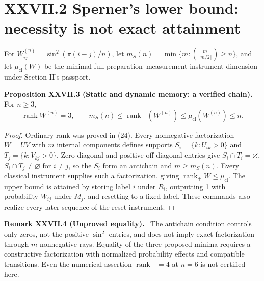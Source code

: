 \documentclass[11pt,a4paper,oneside]{book}
\DeclareMathOperator{\rank}{rank}\DeclareMathOperator{\Tr}{Tr}
\newcommand{\statement}[3]{\par\medskip\noindent\textbf{#1 #2 (#3).}\ }
\begin{document}
\section*{XXVII.2 Sperner's lower bound: necessity is not exact attainment}
For $W^{(n)}_{ij}=\sin^2(\pi(i-j)/n)$, let $m_S(n)=\min\{m:\binom m{\lfloor m/2\rfloor}\ge n\}$, and let $\mu_{\mathrm{cl}}(W)$ be the minimal full preparation--measurement instrument dimension under Section II's passport.
\statement{Proposition}{XXVII.3}{Static and dynamic memory: a verified chain} For $n\ge3$,
\begin{equation}\rank W^{(n)}=3,\qquad m_S(n)\le\rank_+(W^{(n)})\le\mu_{\mathrm{cl}}(W^{(n)})\le n.\tag{108}\end{equation}
\begin{proof}Ordinary rank was proved in (24). Every nonnegative factorization $W=UV$ with $m$ internal components defines supports $S_i=\{k:U_{ik}>0\}$ and $T_j=\{k:V_{kj}>0\}$. Zero diagonal and positive off-diagonal entries give $S_i\cap T_i=\varnothing$, $S_i\cap T_j\ne\varnothing$ for $i\ne j$, so the $S_i$ form an antichain and $m\ge m_S(n)$. Every classical instrument supplies such a factorization, giving $\rank_+W\le\mu_{\mathrm{cl}}$. The upper bound is attained by storing label $i$ under $R_i$, outputting 1 with probability $W_{ij}$ under $M_j$, and resetting to a fixed label. These commands also realize every later sequence of the reset instrument.\end{proof}
\statement{Remark}{XXVII.4}{Unproved equality} The antichain condition controls only zeros, not the positive $\sin^2$ entries, and does not imply exact factorization through $m$ nonnegative rays. Equality of the three proposed minima requires a constructive factorization with normalized probability effects and compatible transitions. Even the numerical assertion $\rank_+=4$ at $n=6$ is not certified here.
\end{document}
